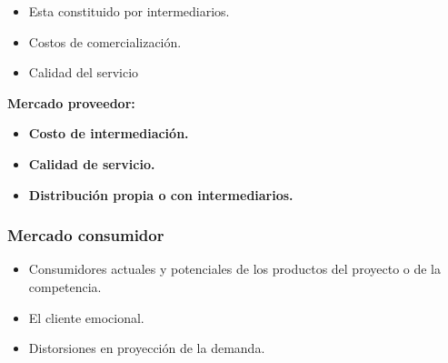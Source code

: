 \documentclass{templateNote}
\begin{document}
\begin{itemize}
    \item Esta constituido por intermediarios.
    \item Costos de comercialización.
    \item Calidad del servicio
\end{itemize}

\textbf{Mercado proveedor:}
\begin{itemize}
    \item \textbf{Costo de intermediación.}
    \item \textbf{Calidad de servicio.}
    \item \textbf{Distribución propia o con intermediarios.}
\end{itemize}

\subsubsection*{Mercado consumidor}
\begin{itemize}
    \item Consumidores actuales y potenciales de los productos del proyecto o de la competencia.
    \item El cliente emocional.
    \item Distorsiones en proyección de la demanda.
\end{itemize}
\end{document}
